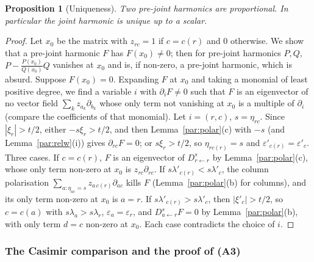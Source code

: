 \documentclass[10pt]{amsart}
\newtheorem{proposition}[theorem]{Proposition}
\theoremstyle{definition}
\theoremstyle{remark}
\begin{document}
\begin{proposition}[Uniqueness]\label{par:unique}
Two pre-joint harmonics are proportional. In particular the joint harmonic is unique up to a scalar.
\end{proposition}
\begin{proof}
Let $x_0$ be the matrix with $z_{rc}=1$ if $c=c(r)$ and $0$ otherwise. We show that a pre-joint
harmonic $F$ has $F(x_0)\ne0$; then for pre-joint harmonics $P,Q$, $P-\tfrac{P(x_0)}{Q(x_0)}Q$
vanishes at $x_0$ and is, if non-zero, a pre-joint harmonic, which is absurd. Suppose $F(x_0)=0$.
Expanding $F$ at $x_0$ and taking a monomial of least positive degree, we find a variable $i$ with
$\partial_iF\ne0$ such that $F$ is an eigenvector of no vector field $\sum_kz_{a_k}\partial_{b_k}$ whose
only term not vanishing at $x_0$ is a multiple of $\partial_i$ (compare the coefficients of that
monomial). Let $i=(r,c)$, $s=\eta_{rc}$. Since $|\xi_r|>t/2$, either $-s\xi_r>t/2$, and then
Lemma~\ref{par:polar}(c) with $-s$ (and Lemma~\ref{par:relw}(i)) gives $\partial_{rc}F=0$; or
$s\xi_r>t/2$, so $\eta_{rc(r)}=s$ and $\varepsilon'_{c(r)}=\varepsilon'_c$. Three cases. If $c=c(r)$, $F$ is an
eigenvector of $D^s_{r\leftarrow r}$ by Lemma~\ref{par:polar}(c), whose only term non-zero at $x_0$
is $z_{rc}\partial_{rc}$. If $s\lambda'_{c(r)}<s\lambda'_c$, the column polarisation
$\sum_{a:\eta_{ac}=s}z_{a\,c(r)}\partial_{ac}$ kills $F$ (Lemma~\ref{par:polar}(b) for columns), and its only
term non-zero at $x_0$ is $a=r$. If $s\lambda'_{c(r)}>s\lambda'_c$, then $|\xi'_c|>t/2$, so $c=c(a)$ with
$s\lambda_a>s\lambda_r$, $\varepsilon_a=\varepsilon_r$, and $D^s_{a\leftarrow r}F=0$ by Lemma~\ref{par:polar}(b),
with only term $d=c$ non-zero at $x_0$. Each case contradicts the choice of $i$.
\end{proof}

\subsubsection{The Casimir comparison and the proof of (A3)}\label{par:ss-A3}
\end{document}
